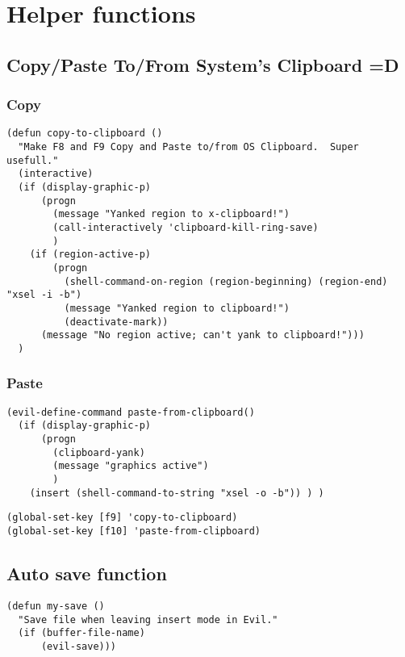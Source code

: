 \documentclass[11pt]{article}
\begin{document}
\section*{Helper functions}
\label{sec:orgf94048d}


\subsection*{Copy/Paste To/From System's Clipboard =D}
\label{sec:org0fdaad8}


\subsubsection*{Copy}
\label{sec:orgc7c54dc}

\begin{verbatim}
(defun copy-to-clipboard ()
  "Make F8 and F9 Copy and Paste to/from OS Clipboard.  Super usefull."
  (interactive)
  (if (display-graphic-p)
      (progn
        (message "Yanked region to x-clipboard!")
        (call-interactively 'clipboard-kill-ring-save)
        )
    (if (region-active-p)
        (progn
          (shell-command-on-region (region-beginning) (region-end) "xsel -i -b")
          (message "Yanked region to clipboard!")
          (deactivate-mark))
      (message "No region active; can't yank to clipboard!")))
  )
\end{verbatim}


\subsubsection*{Paste}
\label{sec:org38ff27b}

\begin{verbatim}
(evil-define-command paste-from-clipboard()
  (if (display-graphic-p)
      (progn
        (clipboard-yank)
        (message "graphics active")
        )
    (insert (shell-command-to-string "xsel -o -b")) ) )
\end{verbatim}

\begin{verbatim}
(global-set-key [f9] 'copy-to-clipboard)
(global-set-key [f10] 'paste-from-clipboard)
\end{verbatim}


\subsection*{Auto save function}
\label{sec:org7500c23}

\begin{verbatim}
(defun my-save ()
  "Save file when leaving insert mode in Evil."
  (if (buffer-file-name)
      (evil-save)))
\end{verbatim}
\end{document}
